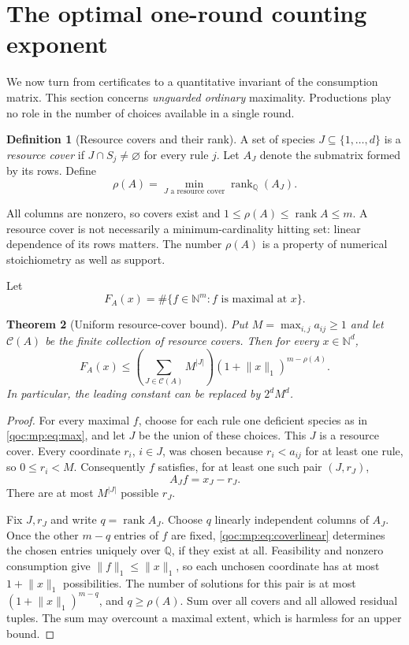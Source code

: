 \documentclass[11pt,letterpaper]{article}
\newtheorem{theorem}{Theorem}[section]
\theoremstyle{definition}
\newtheorem{definition}[theorem]{Definition}
\theoremstyle{remark}
\newcommand{\N}{\mathbb N}
\newcommand{\Q}{\mathbb Q}
\newcommand{\rank}{\operatorname{rank}}
\newcommand{\cC}{\mathcal C}
\newcommand{\size}[1]{\lVert #1\rVert_1}
\begin{document}
\section{The optimal one-round counting exponent}\label{qoc:mp:sec:rank}
We now turn from certificates to a quantitative invariant of the
consumption matrix. This section concerns \emph{unguarded ordinary}
maximality. Productions play no role in the number of choices available
in a single round.

\begin{definition}[Resource covers and their rank]\label{qoc:mp:def:rho}
A set of species $J\subseteq\{1,\ldots,d\}$ is a \emph{resource cover} if
$J\cap S_j\ne\varnothing$ for every rule $j$. Let $A_J$ denote the submatrix
formed by its rows. Define
\begin{equation}\label{qoc:mp:eq:rho}
 \rho(A)=\min_{J\text{ a resource cover}}\rank_{\Q}(A_J).
\end{equation}
\end{definition}
All columns are nonzero, so covers exist and
$1\le\rho(A)\le\rank A\le m$. A resource cover is not necessarily a
minimum-cardinality hitting set: linear dependence of its rows matters.
The number $\rho(A)$ is a property of numerical stoichiometry as well as
support.

Let
\[
 F_A(x)=\#\{f\in\N^m: f\text{ is maximal at }x\}.
\]

\begin{theorem}[Uniform resource-cover bound]\label{qoc:mp:thm:rankupper}
Put $M=\max_{i,j}a_{ij}\ge1$ and let $\cC(A)$ be the finite collection of
resource covers. Then for every $x\in\N^d$,
\begin{equation}\label{qoc:mp:eq:rankbound}
 F_A(x)\le
 \left(\sum_{J\in\cC(A)}M^{|J|}\right)
 (1+\size x)^{m-\rho(A)}.
\end{equation}
In particular, the leading constant can be replaced by $2^dM^d$.
\end{theorem}
\begin{proof}
For every maximal $f$, choose for each rule one deficient species as in
\eqref{qoc:mp:eq:max}, and let $J$ be the union of these choices. This $J$ is a
resource cover. Every coordinate $r_i$, $i\in J$, was chosen because
$r_i<a_{ij}$ for at least one rule, so $0\le r_i<M$. Consequently $f$
satisfies, for at least one such pair $(J,r_J)$,
\begin{equation}\label{qoc:mp:eq:coverlinear}
 A_J f=x_J-r_J.
\end{equation}
There are at most $M^{|J|}$ possible $r_J$.

Fix $J,r_J$ and write $q=\rank A_J$. Choose $q$ linearly independent
columns of $A_J$. Once the other $m-q$ entries of $f$ are fixed,
\eqref{qoc:mp:eq:coverlinear} determines the chosen entries uniquely over $\Q$,
if they exist at all. Feasibility and nonzero consumption give
$\size f\le\size x$, so each unchosen coordinate has at most
$1+\size x$ possibilities. The number of solutions for this pair is at
most $(1+\size x)^{m-q}$, and $q\ge\rho(A)$. Sum over all covers and all
allowed residual tuples. The sum may overcount a maximal extent, which
is harmless for an upper bound.
\end{proof}
\end{document}
